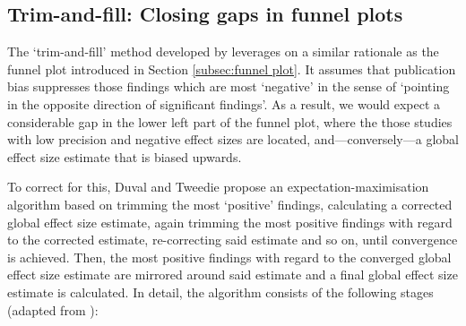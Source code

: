 \subsection{Trim-and-fill: Closing gaps in funnel plots}
The `trim-and-fill' method developed by \citet{duval_trim_2000, duval_nonparametric_2000} leverages on a similar rationale as the funnel plot introduced in Section \ref{subsec:funnel plot}. It assumes that publication bias suppresses those findings which are most `negative' in the sense of `pointing in the opposite direction of significant findings'. As a result, we would expect a considerable gap in the lower left part of the funnel plot, where the those studies with low precision and negative effect sizes are located, and---conversely---a global effect size estimate that is biased upwards.\par %
To correct for this, Duval and Tweedie propose an expectation-maximisation algorithm based on trimming the most `positive' findings, calculating a corrected global effect size estimate, again trimming the most positive findings with regard to the corrected estimate, re-correcting said estimate and so on, until convergence is achieved. Then, the most positive findings with regard to the converged global effect size estimate are mirrored around said estimate and a final global effect size estimate is calculated. In detail, the algorithm consists of the following stages (adapted from \citet{duval_trim_2005}): 
